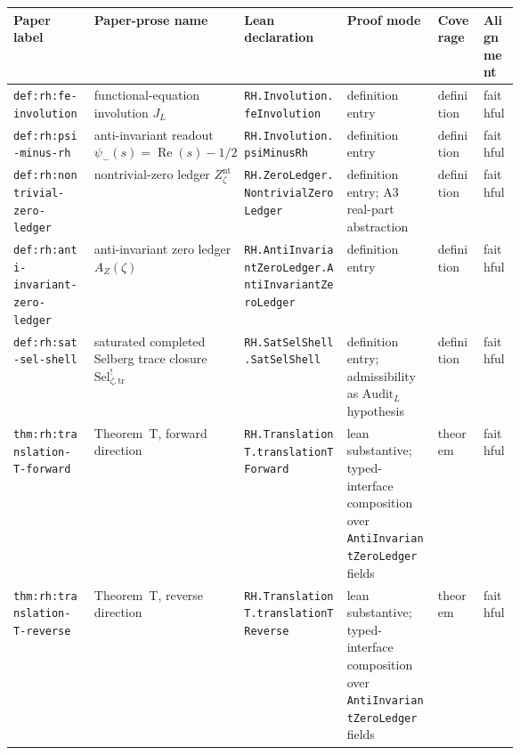 \documentclass[11pt]{article}
\DeclareMathOperator{\Real}{Re}
\newcommand{\JL}{J_{L}}
\newcommand{\psimRH}{\psi_{-}}
\newcommand{\Znt}{Z_{\zeta}^{\mathrm{nt}}}
\newcommand{\AZ}{A_{Z}(\zeta)}
\newcommand{\Sel}{\mathrm{Sel}^{!}_{\zeta,\mathrm{tr}}}
\theoremstyle{definition}
\begin{document}
\clearpage
\begingroup
\setlength{\vfuzz}{30pt}
\begin{landscape}
\begin{table}[!ht]
\centering
\tiny
\setlength{\tabcolsep}{3pt}
\renewcommand{\arraystretch}{0.88}
\begin{tabularx}{\linewidth}{@{}
  >{\raggedright\arraybackslash}p{0.16\linewidth}
  >{\raggedright\arraybackslash}p{0.16\linewidth}
  >{\raggedright\arraybackslash}X
  >{\raggedright\arraybackslash}p{0.18\linewidth}
  >{\raggedright\arraybackslash}p{0.09\linewidth}
  >{\raggedright\arraybackslash}p{0.07\linewidth}@{}}
\toprule
Paper label & Paper-prose name & Lean declaration &
Proof mode & Coverage & Alignment \\
\midrule
\nolinkurl{def:rh:fe-involution} &
functional-equation involution \(\JL\) &
\nolinkurl{RH.Involution.feInvolution} &
definition entry &
definition &
faithful \\

\nolinkurl{def:rh:psi-minus-rh} &
anti-invariant readout \(\psimRH(s)=\Real(s)-1/2\) &
\nolinkurl{RH.Involution.psiMinusRh} &
definition entry &
definition &
faithful \\

\nolinkurl{def:rh:nontrivial-zero-ledger} &
nontrivial-zero ledger \(\Znt\) &
\nolinkurl{RH.ZeroLedger.NontrivialZeroLedger} &
definition entry; A3 real-part abstraction &
definition &
faithful \\

\nolinkurl{def:rh:anti-invariant-zero-ledger} &
anti-invariant zero ledger \(\AZ\) &
\nolinkurl{RH.AntiInvariantZeroLedger.AntiInvariantZeroLedger} &
definition entry &
definition &
faithful \\

\nolinkurl{def:rh:sat-sel-shell} &
saturated completed Selberg trace closure \(\Sel\) &
\nolinkurl{RH.SatSelShell.SatSelShell} &
definition entry; admissibility as \(\mathrm{Audit}_L\) hypothesis &
definition &
faithful \\

\nolinkurl{thm:rh:translation-T-forward} &
Theorem~T, forward direction &
\nolinkurl{RH.TranslationT.translationTForward} &
lean substantive; typed-interface composition over
\texttt{AntiInvariantZeroLedger} fields &
theorem &
faithful \\

\nolinkurl{thm:rh:translation-T-reverse} &
Theorem~T, reverse direction &
\nolinkurl{RH.TranslationT.translationTReverse} &
lean substantive; typed-interface composition over
\texttt{AntiInvariantZeroLedger} fields &
theorem &
faithful \\


\end{tabularx}
\end{table}
\end{landscape}
\end{document}

